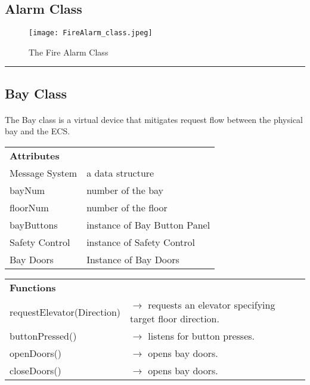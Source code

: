 \documentclass[12pt]{article}
\begin{document}
	\subsection*{Alarm Class}
    \begin{figure}[H]
  		\centerline{\texttt{[image: FireAlarm\_class.jpeg]}}
  		\caption{The Fire Alarm Class}
  		\label{fig:FireAlarm_class}
	\end{figure}
	\par\noindent\rule{\textwidth}{0.4pt}
	
	\subsection*{Bay Class}
	\paragraph{}The Bay class is a virtual device that mitigates request flow between the physical bay and the ECS.
	\begin{table}[H]
        \begin{tabular}{lp{12cm}}
        	\textbf{Attributes}    & \\
        	Message System         & a data structure \\
        	bayNum                 & number of the bay \\
        	floorNum               & number of the floor \\
        	bayButtons             & instance of Bay Button Panel \\
        	Safety Control         & instance of Safety Control \\
        	Bay Doors              & Instance of Bay Doors \\
        \end{tabular}
	\end{table}
    \begin{table}[H]
    	\begin{tabular}{lp{12cm}}
    		\textbf{Functions}          & \\
        	requestElevator(Direction)  & $\rightarrow$ requests an elevator specifying target floor direction.\\
	        buttonPressed()             & $\rightarrow$ listens for button presses.\\
	        openDoors()                 & $\rightarrow$ opens bay doors.\\
	        closeDoors()                & $\rightarrow$ opens bay doors.\\
		\end{tabular}
	\end{table}
\end{document}
